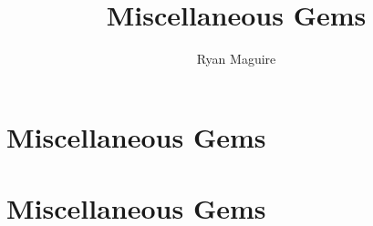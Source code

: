 \documentclass[crop=false,class=book,oneside]{standalone}
\begin{document}
    \newif\ifworkmiscellaneousgems
    \ifx\ifundergraduatemathematicswork\undefined
        \title{Miscellaneous Gems}
        \author{Ryan Maguire}
        \date{\vspace{-5ex}}
        \maketitle
        \tableofcontents
        \clearpage
        \chapter*{Miscellaneous Gems}
        \setcounter{chapter}{1}
    \else
        \chapter{Miscellaneous Gems}
    \fi
\end{document}
